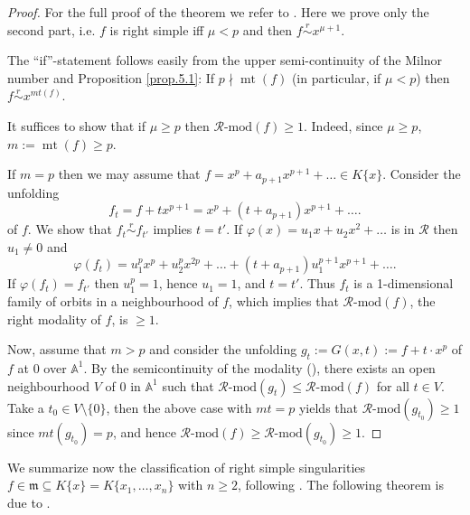 \documentclass[11pt]{article}
\DeclareMathOperator{\mt}{mt}
\begin{document}
\begin{proof}
For the full proof of the theorem we refer to \cite[Thm. 3.1]{Ng12}.
Here we prove only the second part, i.e. $f$ is right simple iff $\mu<p$ and then $f\overset{r }{\sim} x^{\mu+1}$. 

The ``if''-statement follows easily from the upper semi-continuity of the Milnor number and Proposition \ref{prop.5.1}: If $p\nmid \mt(f)$ (in particular, if $\mu<p$) then $f\overset{r }{\sim} x^{mt(f)}$.

It suffices to show that if $\mu\geq p$ then $\mathcal{R}\text{-}\mathrm{mod}(f)\geq 1$. Indeed, since $\mu\geq p$, $m:=\mt(f)\geq p$. 

If $m=p$ then we may assume that $f=x^p+a_{p+1}x^{p+1}+\ldots\in K\{x\}$. Consider the unfolding
$$f_t=f+tx^{p+1}=x^p+(t+a_{p+1})x^{p+1}+\ldots.$$
of $f$. We show that  $f_t\overset{r }{\sim} f_{t'}$ implies $t=t'$. If $\varphi(x)=u_1x+u_2x^2+\ldots$ is in $\mathcal{R}$ then $u_1\neq 0$ and 
$$\varphi(f_t)=u_1^px^p+u_2^px^{2p}+\ldots+ (t+a_{p+1}) u_1^{p+1}x^{p+1}+\ldots.$$
If $\varphi(f_t)=f_{t'}$ then $u_1^p=1$, hence $u_1=1$, and $t=t'$. Thus $f_t$
is a 1-dimensional family of orbits in a neighbourhood  of $f$, which  implies that $\mathcal{R}\text{-}\mathrm{mod}(f)$, the right modality of $f$, is $\geq 1$.

Now, assume that $m>p$ and consider the unfolding $g_t:=G(x,t):=f+t\cdot x^{p}$ of $f$ at $0$ over $\mathbb A^1$. By the semicontinuity of the modality (\cite[Proposition 3.3.14]{GLS25}), there exists an open neighbourhood $V$ of $0$ in $\mathbb A^1$ such that 
$\mathcal{R}\text{-}\mathrm{mod}(g_{t})\leq \mathcal{R}\text{-}\mathrm{mod}(f)$ for all $t\in V$. Take a $t_0\in V\setminus \{0\}$, then the above case with $mt=p$ yields that $\mathcal{R}\text{-}\mathrm{mod}(g_{t_0})\geq 1$ since $mt(g_{t_0})=p$, and hence
$\mathcal{R}\text{-}\mathrm{mod}(f)\geq \mathcal{R}\text{-}\mathrm{mod}(g_{t_0})\geq 1.$
\end{proof}


We summarize now the classification of right simple singularities $f\in \mathfrak{m}\subseteq K\{x\}=K\{x_1,\ldots,x_n\}$  with $n \ge 2$, following \cite{GN16}. 
The following theorem is due to \cite [Theorem 3.2]{GN16}.
\end{document}
